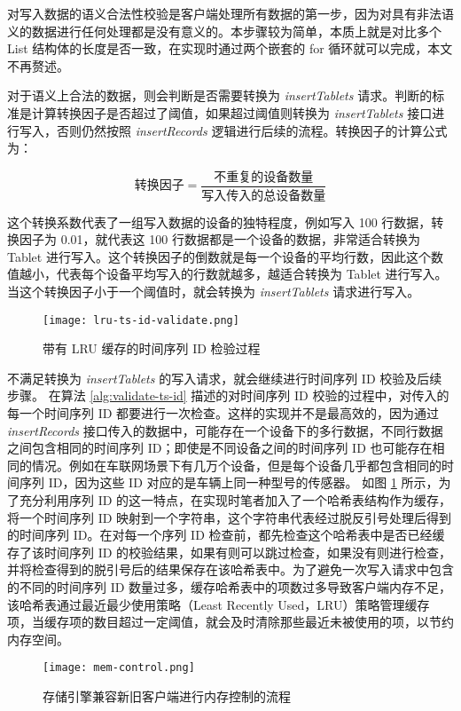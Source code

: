 对写入数据的语义合法性校验是客户端处理所有数据的第一步，因为对具有非法语义的数据进行任何处理都是没有意义的。本步骤较为简单，本质上就是对比多个 List 结构体的长度是否一致，在实现时通过两个嵌套的 for 循环就可以完成，本文不再赘述。

对于语义上合法的数据，则会判断是否需要转换为 \emph{insertTablets} 请求。判断的标准是计算转换因子是否超过了阈值，如果超过阈值则转换为 \emph{insertTablets} 接口进行写入，否则仍然按照 \emph{insertRecords} 逻辑进行后续的流程。转换因子的计算公式为：

$$\text{转换因子} = \frac{\text{不重复的设备数量}}{\text{写入传入的总设备数量}}$$

这个转换系数代表了一组写入数据的设备的独特程度，例如写入 100 行数据，转换因子为 0.01，就代表这 100 行数据都是一个设备的数据，非常适合转换为 Tablet 进行写入。这个转换因子的倒数就是每一个设备的平均行数，因此这个数值越小，代表每个设备平均写入的行数就越多，越适合转换为 Tablet 进行写入。当这个转换因子小于一个阈值时，就会转换为 \emph{insertTablets} 请求进行写入。

\begin{figure}
  \centering
  \texttt{[image: lru-ts-id-validate.png]}
  \caption{带有 LRU 缓存的时间序列 ID 检验过程}
  \label{fig:lru-ts-id-validate}
\end{figure}

不满足转换为 \emph{insertTablets} 的写入请求，就会继续进行时间序列 ID 校验及后续步骤。
在算法 \ref{alg:validate-ts-id} 描述的对时间序列 ID 校验的过程中，对传入的每一个时间序列 ID 都要进行一次检查。这样的实现并不是最高效的，因为通过 \emph{insertRecords} 接口传入的数据中，可能存在一个设备下的多行数据，不同行数据之间包含相同的时间序列 ID；即使是不同设备之间的时间序列 ID 也可能存在相同的情况。例如在车联网场景下有几万个设备，但是每个设备几乎都包含相同的时间序列 ID，因为这些 ID 对应的是车辆上同一种型号的传感器。 如图 \ref{fig:lru-ts-id-validate} 所示，为了充分利用序列 ID 的这一特点，在实现时笔者加入了一个哈希表结构作为缓存，将一个时间序列 ID 映射到一个字符串，这个字符串代表经过脱反引号处理后得到的时间序列 ID。在对每一个序列 ID 检查前，都先检查这个哈希表中是否已经缓存了该时间序列 ID 的校验结果，如果有则可以跳过检查，如果没有则进行检查，并将检查得到的脱引号后的结果保存在该哈希表中。为了避免一次写入请求中包含的不同的时间序列 ID 数量过多，缓存哈希表中的项数过多导致客户端内存不足，该哈希表通过最近最少使用策略（Least Recently Used，LRU）策略管理缓存项，当缓存项的数目超过一定阈值，就会及时清除那些最近未被使用的项，以节约内存空间。

\begin{figure}
  \centering
  \texttt{[image: mem-control.png]}
  \caption{存储引擎兼容新旧客户端进行内存控制的流程}
  \label{fig:mem-control-compatibility}
\end{figure}


